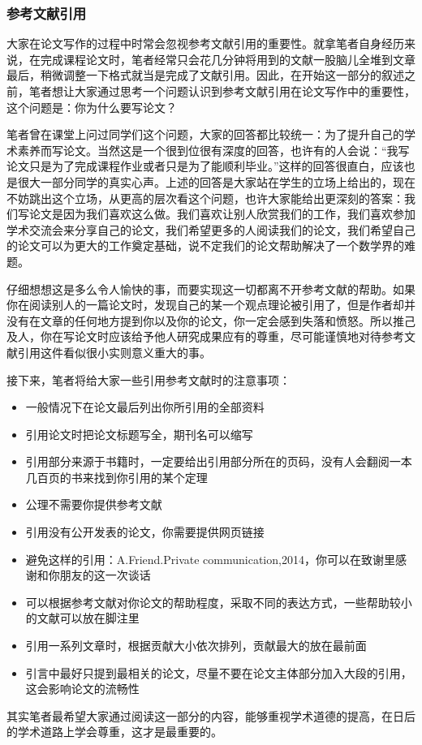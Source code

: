 \documentclass{formatBook}
\begin{document}
\subsubsection{参考文献引用}
大家在论文写作的过程中时常会忽视参考文献引用的重要性。就拿笔者自身经历来说，在完成课程论文时，笔者经常只会花几分钟将用到的文献一股脑儿全堆到文章最后，稍微调整一下格式就当是完成了文献引用。因此，在开始这一部分的叙述之前，笔者想让大家通过思考一个问题认识到参考文献引用在论文写作中的重要性，这个问题是：你为什么要写论文？\par
笔者曾在课堂上问过同学们这个问题，大家的回答都比较统一：为了提升自己的学术素养而写论文。当然这是一个很到位很有深度的回答，也许有的人会说：“我写论文只是为了完成课程作业或者只是为了能顺利毕业。”这样的回答很直白，应该也是很大一部分同学的真实心声。上述的回答是大家站在学生的立场上给出的，现在不妨跳出这个立场，从更高的层次看这个问题，也许大家能给出更深刻的答案：我们写论文是因为我们喜欢这么做。我们喜欢让别人欣赏我们的工作，我们喜欢参加学术交流会来分享自己的论文，我们希望更多的人阅读我们的论文，我们希望自己的论文可以为更大的工作奠定基础，说不定我们的论文帮助解决了一个数学界的难题。\par
仔细想想这是多么令人愉快的事，而要实现这一切都离不开参考文献的帮助。如果你在阅读别人的一篇论文时，发现自己的某一个观点理论被引用了，但是作者却并没有在文章的任何地方提到你以及你的论文，你一定会感到失落和愤怒。所以推己及人，你在写论文时应该给予他人研究成果应有的尊重，尽可能谨慎地对待参考文献引用这件看似很小实则意义重大的事。\par
接下来，笔者将给大家一些引用参考文献时的注意事项\cite{pak_how_nodate}：
\begin{itemize}
    \item 一般情况下在论文最后列出你所引用的全部资料
    \item 引用论文时把论文标题写全，期刊名可以缩写
    \item 引用部分来源于书籍时，一定要给出引用部分所在的页码，没有人会翻阅一本几百页的书来找到你引用的某个定理
    \item 公理不需要你提供参考文献
    \item 引用没有公开发表的论文，你需要提供网页链接
    \item 避免这样的引用：A.Friend.Private communication,2014，你可以在致谢里感谢和你朋友的这一次谈话
    \item 可以根据参考文献对你论文的帮助程度，采取不同的表达方式，一些帮助较小的文献可以放在脚注里
    \item 引用一系列文章时，根据贡献大小依次排列，贡献最大的放在最前面
    \item 引言中最好只提到最相关的论文，尽量不要在论文主体部分加入大段的引用，这会影响论文的流畅性
\end{itemize}
\par
其实笔者最希望大家通过阅读这一部分的内容，能够重视学术道德的提高，在日后的学术道路上学会尊重，这才是最重要的。
\end{document}
